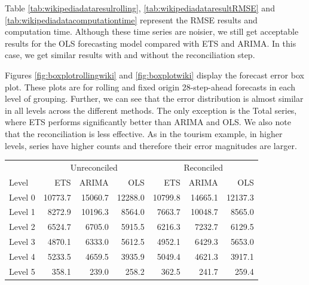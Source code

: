 \documentclass[11pt,a4paper,]{article}
\let\origtable\table
\let\endorigtable\endtable
\renewenvironment{table}[1][2] {
    \expandafter\origtable\expandafter[!htbp]
} {
    \endorigtable
}
\begin{document}
Table \ref{tab:wikipediadataresulrolling},
\ref{tab:wikipediadataresultRMSE} and
\ref{tab:wikipediadatacomputationtime} represent the RMSE results and
computation time. Although these time series are noisier, we still get
acceptable results for the OLS forecasting model compared with ETS and
ARIMA. In this case, we get similar results with and without the
reconciliation step.

Figures \ref{fig:boxplotrollingwiki} and \ref{fig:boxplotwiki} display
the forecast error box plot. These plots are for rolling and fixed
origin 28-step-ahead forecasts in each level of grouping. Further, we
can see that the error distribution is almost similar in all levels
across the different methods. The only exception is the Total series,
where ETS performs significantly better than ARIMA and OLS. We also note
that the reconciliation is less effective. As in the tourism example, in
higher levels, series have higher counts and therefore their error
magnitudes are larger.

\begin{table}[!h]

\caption{\label{tab:wikipediadataresulrolling}Mean(RMSE) for ETS, ARIMA and OLS with and without reconciliation - Rolling origin 28-step-ahead - Wikipedia dataset}
\centering
\begin{tabular}{lrrrrrr}
\toprule
\multicolumn{1}{c}{} & \multicolumn{3}{c}{Unreconciled} & \multicolumn{3}{c}{Reconciled} \\
\cmidrule(l{2pt}r{2pt}){2-4} \cmidrule(l{2pt}r{2pt}){5-7}
Level & ETS & ARIMA & OLS & ETS & ARIMA & OLS\\
\midrule
Level 0 & 10773.7 & 15060.7 & 12288.0 & 10799.8 & 14665.1 & 12137.3\\
Level 1 & 8272.9 & 10196.3 & 8564.0 & 7663.7 & 10048.7 & 8565.0\\
Level 2 & 6524.7 & 6705.0 & 5915.5 & 6216.3 & 7232.7 & 6129.5\\
Level 3 & 4870.1 & 6333.0 & 5612.5 & 4952.1 & 6429.3 & 5653.0\\
Level 4 & 5233.5 & 4659.5 & 3935.9 & 5049.4 & 4621.3 & 3917.1\\
Level 5 & 358.1 & 239.0 & 258.2 & 362.5 & 241.7 & 259.4\\
\bottomrule
\end{tabular}
\end{table}
\end{document}
